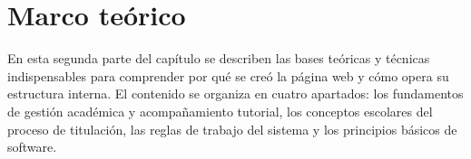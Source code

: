\section{Marco teórico}
\label{sec:marco_teorico}

En esta segunda parte del capítulo se describen las bases teóricas y técnicas indispensables para comprender por qué se creó la página web y cómo opera su estructura interna. El contenido se organiza en cuatro apartados: los fundamentos de gestión académica y acompañamiento tutorial, los conceptos escolares del proceso de titulación, las reglas de trabajo del sistema y los principios básicos de software.




